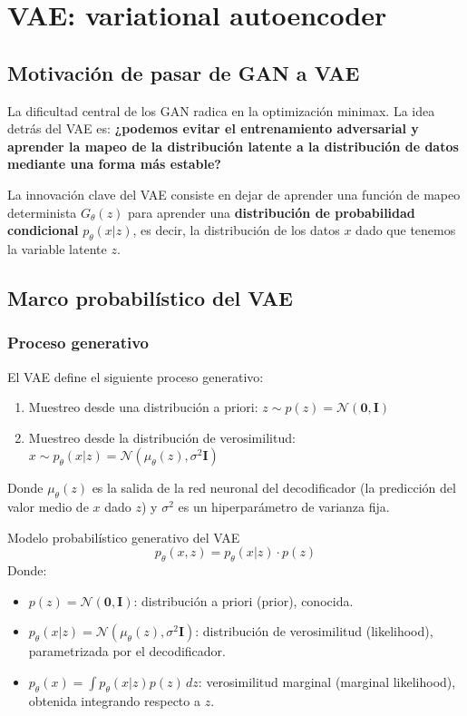 \section{VAE: variational autoencoder}

\subsection{Motivación de pasar de GAN a VAE}

La dificultad central de los GAN radica en la optimización minimax. La idea detrás del VAE es: \textbf{¿podemos evitar el entrenamiento adversarial y aprender la mapeo de la distribución latente a la distribución de datos mediante una forma más estable?}

La innovación clave del VAE consiste en dejar de aprender una función de mapeo determinista $G_\theta(z)$ para aprender una \textbf{distribución de probabilidad condicional} $p_\theta(x|z)$, es decir, la distribución de los datos $x$ dado que tenemos la variable latente $z$.

\subsection{Marco probabilístico del VAE}

\subsubsection{Proceso generativo}

El VAE define el siguiente proceso generativo:

\begin{enumerate}
    \item Muestreo desde una distribución a priori: $z \sim p(z) = \mathcal{N}(\mathbf{0}, \mathbf{I})$
    \item Muestreo desde la distribución de verosimilitud: $x \sim p_\theta(x|z) = \mathcal{N}(\mu_\theta(z), \sigma^2 \mathbf{I})$
\end{enumerate}

Donde $\mu_\theta(z)$ es la salida de la red neuronal del decodificador (la predicción del valor medio de $x$ dado $z$) y $\sigma^2$ es un hiperparámetro de varianza fija.

\begin{importantbox}{Modelo probabilístico generativo del VAE}
$$p_\theta(x, z) = p_\theta(x|z) \cdot p(z)$$
Donde:
\begin{itemize}
    \item $p(z) = \mathcal{N}(\mathbf{0}, \mathbf{I})$: distribución a priori (prior), conocida.
    \item $p_\theta(x|z) = \mathcal{N}(\mu_\theta(z), \sigma^2 \mathbf{I})$: distribución de verosimilitud (likelihood), parametrizada por el decodificador.
    \item $p_\theta(x) = \int p_\theta(x|z) p(z) \, dz$: verosimilitud marginal (marginal likelihood), obtenida integrando respecto a $z$.
\end{itemize}
\end{importantbox}

